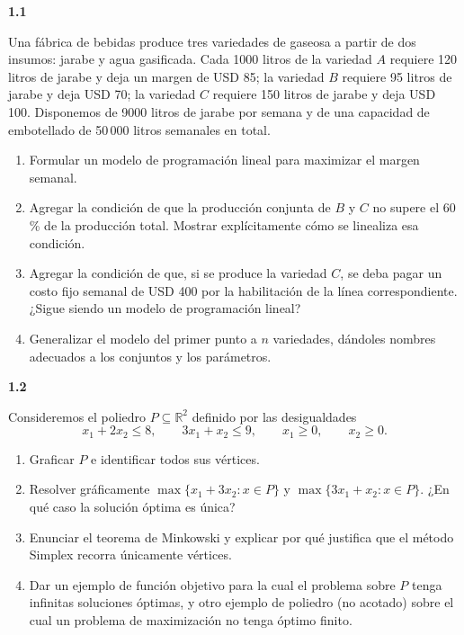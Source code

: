 \documentclass[11pt,a4paper]{article}
\newcommand{\ejercicio}[1]{\par\medskip\noindent\textbf{#1}\par\nopagebreak\smallskip}
\newcommand{\R}{\mathbb{R}}
\begin{document}
\ejercicio{1.1}
Una fábrica de bebidas produce tres variedades de gaseosa a partir de dos
insumos: jarabe y agua gasificada. Cada 1000 litros de la variedad $A$ requiere
120 litros de jarabe y deja un margen de USD 85; la variedad $B$ requiere 95
litros de jarabe y deja USD 70; la variedad $C$ requiere 150 litros de jarabe y
deja USD 100. Disponemos de 9000 litros de jarabe por semana y de una capacidad
de embotellado de 50\,000 litros semanales en total.
\begin{enumerate}
  \item Formular un modelo de programación lineal para maximizar el margen
  semanal.
  \item Agregar la condición de que la producción conjunta de $B$ y $C$ no
  supere el 60\,\% de la producción total. Mostrar explícitamente cómo se
  linealiza esa condición.
  \item Agregar la condición de que, si se produce la variedad $C$, se deba
  pagar un costo fijo semanal de USD 400 por la habilitación de la línea
  correspondiente. ¿Sigue siendo un modelo de programación lineal?
  \item Generalizar el modelo del primer punto a $n$ variedades, dándoles
  nombres adecuados a los conjuntos y los parámetros.
\end{enumerate}

\ejercicio{1.2}
Consideremos el poliedro $P \subseteq \R^2$ definido por las desigualdades
\[
x_1 + 2x_2 \le 8, \qquad 3x_1 + x_2 \le 9, \qquad x_1 \ge 0, \qquad x_2 \ge 0 .
\]
\begin{enumerate}
  \item Graficar $P$ e identificar todos sus vértices.
  \item Resolver gráficamente $\max\{x_1 + 3x_2 : x \in P\}$ y
  $\max\{3x_1 + x_2 : x \in P\}$. ¿En qué caso la solución óptima es única?
  \item Enunciar el teorema de Minkowski y explicar por qué justifica que el
  método Simplex recorra únicamente vértices.
  \item Dar un ejemplo de función objetivo para la cual el problema sobre $P$
  tenga infinitas soluciones óptimas, y otro ejemplo de poliedro (no acotado)
  sobre el cual un problema de maximización no tenga óptimo finito.
\end{enumerate}
\end{document}
